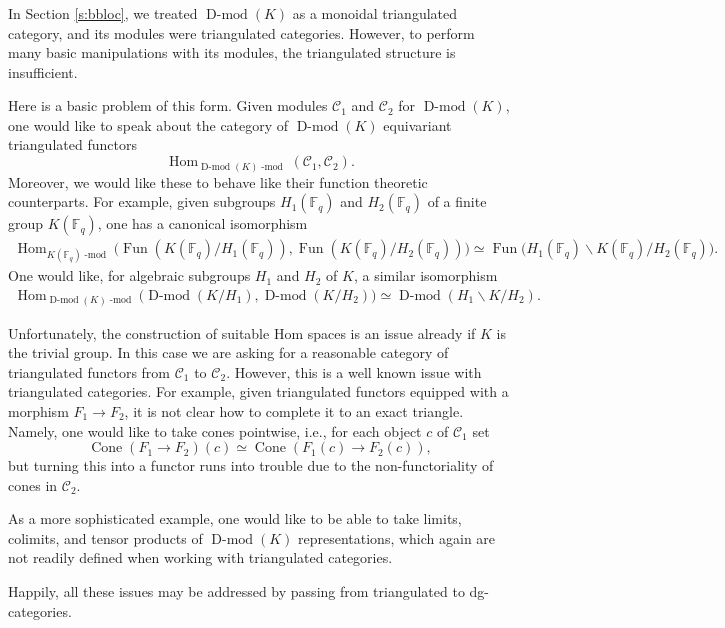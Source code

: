 \documentclass[10pt]{amsart}
\newcommand{\on}{\operatorname}
\renewcommand{\mod}{\on{-mod}}
\newcommand{\Dmod}{\on{D-mod}}
\newcommand{\Fq}{\mathbb{F}_q}
\newcommand{\Fun}{\on{Fun}}
\theoremstyle{remark}
\newcommand{\Hom}{\operatorname{Hom}}
\numberwithin{equation}{section}
\newcommand{\sC}{\mathscr{C}}
\renewcommand{\mod}{\operatorname{-mod}}
\begin{document}
\subsubsection{} In Section \ref{s:bbloc}, we treated $\Dmod(K)$ as a monoidal 
triangulated category, and its modules were triangulated categories. However, 
to perform many basic manipulations with its modules, the 
triangulated structure is insufficient. 

Here is a basic problem of this form. Given modules $\sC_1$ and $\sC_2$ for 
$\Dmod(K)$, one would like to speak about the category of $\Dmod(K)$ equivariant 
triangulated functors 
%
\[
   \Hom_{\Dmod(K)\mod}(\sC_1, \sC_2).
\] 
%
Moreover, we would like these to behave like their function theoretic 
counterparts. For example, given subgroups $H_1(\Fq)$ and $H_2(\Fq)$ of a 
finite group $K(\Fq)$, one has a canonical isomorphism
%
\begin{align*}
  \Hom_{K(\Fq)\mod}\big(\Fun(K(\Fq)/H_1(\Fq)),\Fun(K(\Fq)/H_2(\Fq)) 
  \big) \simeq 
 \Fun\big( H_1(\Fq) \backslash K(\Fq) / H_2(\Fq)\big).
\end{align*}
%
One would like, for algebraic subgroups $H_1$ and $H_2$ of $K$, a similar 
isomorphism 
%
\begin{align*}
\Hom_{\Dmod(K)\mod}\big(\Dmod(K/H_1),\Dmod(K/H_2) 
\big)  
\simeq 
\Dmod( H_1 \backslash K / H_2).
\end{align*}
%

Unfortunately, the construction of suitable Hom spaces is an issue already if 
$K$ is the trivial group. In this 
case we are asking for a reasonable category of triangulated functors from 
$\sC_1$ to $\sC_2$. However, this is a well known issue with triangulated 
categories. For example, given triangulated functors 
equipped 
with a morphism $F_1 \rightarrow F_2$, it is not clear how to complete it to an 
exact triangle. Namely, one would like to take cones pointwise, i.e., for each object $c$ of $\sC_1$ set$$\on{Cone}(F_1 \rightarrow F_2)(c) \simeq \on{Cone}(F_1(c) \rightarrow F_2(c)),$$but turning this into a functor runs into trouble due to the non-functoriality of cones in $\sC_2$. 
	
	
	As a more sophisticated example, one would like to be able to take limits, 
	colimits, and tensor products of $\Dmod(K)$ representations, which again are not 
	readily defined when working with triangulated categories. 
	
	
	Happily, all these issues may be addressed by passing from triangulated to 
	dg-categories.
	
\end{document}
